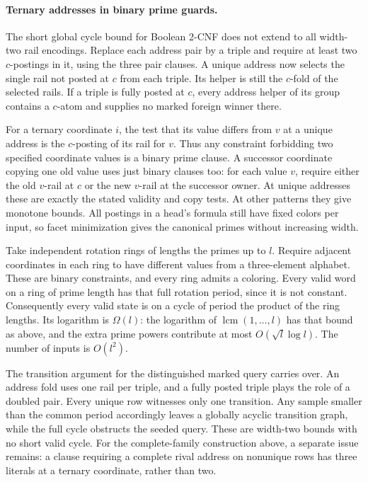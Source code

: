 \paragraph{Ternary addresses in binary prime guards.}
The short global cycle bound for Boolean 2-CNF
does not extend to all width-two rail encodings.
Replace each address pair by a triple and require
at least two $c$-postings in it, using the three
pair clauses. A unique address now selects
the single rail not posted at $c$ from each
triple. Its helper is still the $c$-fold of
the selected rails. If a triple is fully posted
at $c$, every address helper of its group
contains a $c$-atom and supplies no marked
foreign winner there.

For a ternary coordinate $i$, the test that
its value differs from $v$ at a unique address
is the $c$-posting of its rail for $v$. Thus any
constraint forbidding two specified coordinate
values is a binary prime clause. A successor
coordinate copying one old value uses just
binary clauses too: for each value $v$, require
either the old $v$-rail at $c$ or the new
$v$-rail at the successor owner. At unique
addresses these are exactly the stated validity
and copy tests. At other patterns they give
monotone bounds. All postings in a head's
formula still have fixed colors per input,
so facet minimization gives the canonical
primes without increasing width.

Take independent rotation rings of lengths the
primes up to $l$. Require adjacent coordinates in
each ring to have different values from a
three-element alphabet. These are binary
constraints, and every ring admits a coloring.
Every valid word on a ring of prime length has
that full rotation period, since it is not
constant. Consequently every valid state is on
a cycle of period the product of the ring
lengths. Its logarithm is $\Omega(l)$:
the logarithm of $\operatorname{lcm}(1,\ldots,l)$
has that bound as above, and the extra prime
powers contribute at most $O(\sqrt l\log l)$.
The number of inputs is $O(l^2)$.

The transition argument for the distinguished
marked query carries over. An address fold
uses one rail per triple, and a fully posted
triple plays the role of a doubled pair.
Every unique row witnesses only one
transition. Any sample smaller than the
common period accordingly leaves a globally
acyclic transition graph, while the full
cycle obstructs the seeded query. These
are width-two bounds with no short valid
cycle. For the complete-family construction
above, a separate issue remains: a clause
requiring a complete rival address on
nonunique rows has three literals at a
ternary coordinate, rather than two.

